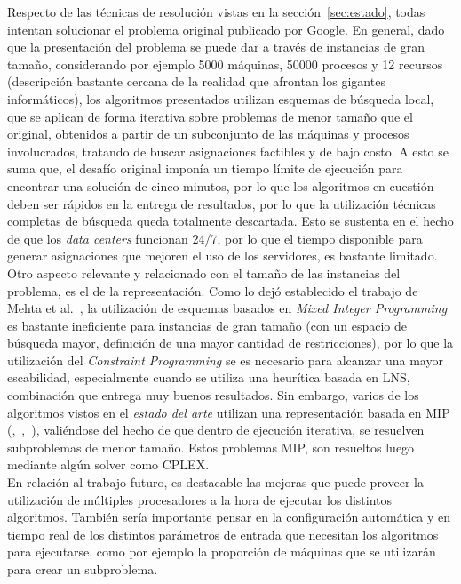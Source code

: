 \documentclass[../informe2.tex]{subfiles}
\begin{document}
Respecto de las técnicas de resolución vistas en la sección~\ref{sec:estado}, todas intentan solucionar el problema original publicado por Google. En general, dado que la presentación del problema se puede dar a través de instancias de gran tamaño, considerando por ejemplo 5000 máquinas, 50000 procesos y 12 recursos (descripción bastante cercana de la realidad que afrontan los gigantes informáticos), los algoritmos presentados utilizan esquemas de búsqueda local, que se aplican de forma iterativa sobre problemas de menor tamaño que el original, obtenidos a partir de un subconjunto de las máquinas y procesos involucrados, tratando de buscar asignaciones factibles y de bajo costo. A esto se suma que, el desafío original imponía un tiempo límite de ejecución para encontrar una solución de cinco minutos, por lo que los algoritmos en cuestión deben ser rápidos en la entrega de resultados, por lo que la utilización técnicas completas de búsqueda queda totalmente descartada. Esto se sustenta en el hecho de que los \textit{data centers} funcionan 24/7, por lo que el tiempo disponible para generar asignaciones que mejoren el uso de los servidores, es bastante limitado. Otro aspecto relevante y relacionado con el tamaño de las instancias del problema, es el de la representación. Como lo dejó establecido el trabajo de Mehta et al.~\cite{mehta2012comparing}, la utilización de esquemas basados en \textit{Mixed Integer Programming} es bastante ineficiente para instancias de gran tamaño (con un espacio de búsqueda mayor, definición de una mayor cantidad de restricciones), por lo que la utilización del \textit{Constraint Programming} se es necesario para alcanzar una mayor escabilidad, especialmente cuando se utiliza una heurítica basada en LNS, combinación que entrega muy buenos resultados. Sin embargo, varios de los algoritmos vistos en el \textit{estado del arte} utilizan una representación basada en MIP (\cite{jaskowskihybrid},~\cite{lopes2015heuristics},~\cite{masson2013iterated}), valiéndose del hecho de que dentro de ejecución iterativa, se resuelven subproblemas de menor tamaño. Estos problemas MIP, son resueltos luego mediante algún solver como CPLEX.\\
En relación al trabajo futuro, es destacable las mejoras que puede proveer la utilización de múltiples procesadores a la hora de ejecutar los distintos algoritmos. También sería importante pensar en la configuración automática y en tiempo real de los distintos parámetros de entrada que necesitan los algoritmos para ejecutarse, como por ejemplo la proporción de máquinas que se utilizarán para crear un subproblema.
\end{document}
